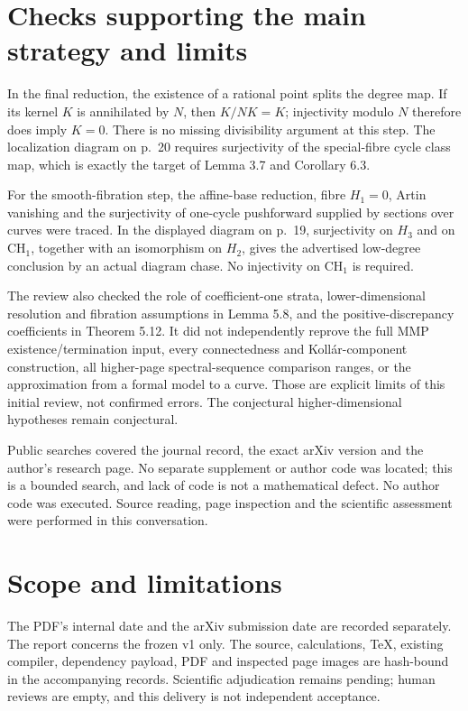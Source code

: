 \documentclass[10pt]{article}
\begin{document}
\section*{Checks supporting the main strategy and limits}
In the final reduction, the existence of a rational point splits the degree map. If its kernel \(K\) is annihilated by \(N\), then \(K/NK=K\); injectivity modulo \(N\) therefore does imply \(K=0\). There is no missing divisibility argument at this step. The localization diagram on p. 20 requires surjectivity of the special-fibre cycle class map, which is exactly the target of Lemma 3.7 and Corollary 6.3.\par
For the smooth-fibration step, the affine-base reduction, fibre \(H_1=0\), Artin vanishing and the surjectivity of one-cycle pushforward supplied by sections over curves were traced. In the displayed diagram on p. 19, surjectivity on \(H_3\) and on \(\mathrm{CH}_1\), together with an isomorphism on \(H_2\), gives the advertised low-degree conclusion by an actual diagram chase. No injectivity on \(\mathrm{CH}_1\) is required.\par
The review also checked the role of coefficient-one strata, lower-dimensional resolution and fibration assumptions in Lemma 5.8, and the positive-discrepancy coefficients in Theorem 5.12. It did not independently reprove the full MMP existence/termination input, every connectedness and Kollár-component construction, all higher-page spectral-sequence comparison ranges, or the approximation from a formal model to a curve. Those are explicit limits of this initial review, not confirmed errors. The conjectural higher-dimensional hypotheses remain conjectural.\par
Public searches covered the journal record, the exact arXiv version and the author’s research page. No separate supplement or author code was located; this is a bounded search, and lack of code is not a mathematical defect. No author code was executed. Source reading, page inspection and the scientific assessment were performed in this conversation.\par
\section*{Scope and limitations}
The PDF’s internal date and the arXiv submission date are recorded separately. The report concerns the frozen v1 only. The source, calculations, TeX, existing compiler, dependency payload, PDF and inspected page images are hash-bound in the accompanying records. Scientific adjudication remains pending; human reviews are empty, and this delivery is not independent acceptance.\par
\end{document}
